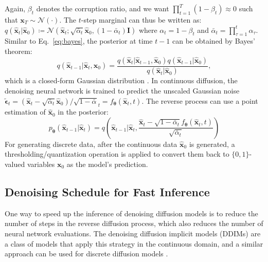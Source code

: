 \documentclass{article}
\theoremstyle{plain}
\theoremstyle{definition}
\theoremstyle{remark}
\begin{document}
Again, $\beta_t$ denotes the corruption ratio, and we want ${\prod_{t=1}^T (1 - \beta_t) \approx 0}$ such that $\mathbf{x}_T \sim \mathcal{N}(\cdot)$. The $t$-step marginal can thus be written as:
$
q(\hat{\mathbf{x}}_t|\hat{\mathbf{x}}_0) \coloneqq \mathcal{N}(\hat{\mathbf{x}}_{t} ; \sqrt{\bar{\alpha}_t} \hat{\mathbf{x}}_{0}, (1 - \bar{\alpha}_t) \mathbf{I})
$
where $\alpha_t = 1 - \beta_t$ and $\bar{\alpha}_t = \prod^{t}_{\tau=1} \alpha_\tau$. Similar to Eq.~\ref{eq:bayes}, the posterior at time $t-1$ can be obtained by Bayes' theorem:
\begin{equation}
q(\hat{\mathbf{x}}_{t-1}|\hat{\mathbf{x}}_t, \mathbf{x}_0)  = \frac{q(\hat{\mathbf{x}}_{t}|\hat{\mathbf{x}}_{t-1}, \hat{\mathbf{x}}_0)q(\hat{\mathbf{x}}_{t-1}|\hat{\mathbf{x}}_0)}{q(\hat{\mathbf{x}}_t | \hat{\mathbf{x}}_0)},
\end{equation}
which is a closed-form Gaussian distribution \citep{ho2020denoising}. In continuous diffusion, the denoising neural network is trained to predict the unscaled Gaussian noise $\widetilde{\boldsymbol{\epsilon}}_t = {(\hat{\mathbf{x}}_t - \sqrt{\bar{\alpha}_t} \hat{\mathbf{x}}_0) / \sqrt{1 - \bar{\alpha}}_t} = f_{\boldsymbol{\theta}}(\hat{\mathbf{x}}_t, t)$. The reverse process \citep{ho2020denoising} can use a point estimation of $\hat{\mathbf{x}}_0$ in the posterior:
\begin{equation}
p_{\boldsymbol{\theta}}(\hat{\mathbf{x}}_{t-1}|\hat{\mathbf{x}}_t) = q\left(\hat{\mathbf{x}}_{t-1}|\hat{\mathbf{x}}_t, \frac{\hat{\mathbf{x}}_t - \sqrt{1 - \bar{\alpha}_t} f_{\boldsymbol{\theta}}(\hat{\mathbf{x}}_t, t)}{\sqrt{\bar{\alpha}_t}}\right)
\end{equation}
For generating discrete data,  after the continuous data $\hat{\mathbf{x}}_0$ is generated, a thresholding/quantization operation is applied to convert them back to $\{0, 1\}$-valued variables $\mathbf{x}_0$ as the model's prediction.

\subsection{Denoising Schedule for Fast Inference} \label{sec:fast_sampling}


One way to speed up the inference of denoising diffusion models is to reduce the number of steps in the reverse diffusion process, which also reduces the number of neural network evaluations. The denoising diffusion implicit models (DDIMs) \citep{song2021denoising} are a class of models that apply this strategy in the continuous domain, and a similar approach can be used for discrete diffusion models \citep{austin2021structured}.
\end{document}
